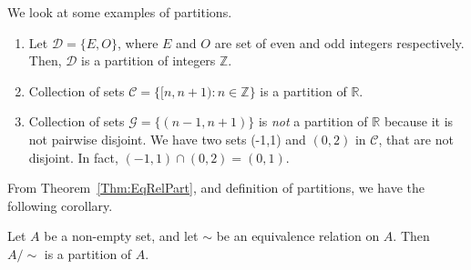 \documentclass[a4paper,english,12pt]{article}
\begin{document}
\begin{exmp} We look at some examples of partitions. 
	\begin{enumerate}
		\item Let $\mathcal{D} = \{E, O\}$, where $E$ and $O$ are set of even and odd integers respectively. Then, $\mathcal{D}$ is a partition of integers $\mathbb{Z}$.
		\item Collection of sets $\mathcal{C} = \{[n, n + 1) : n \in \mathbb{Z}\}$ is a partition of $\mathbb{R}$.
		\item Collection of sets $\mathcal{G} = \{(n-1, n + 1)\}$ is \textit{not} a partition of $\mathbb{R}$ because it is not pairwise disjoint. We have two sets (-1,1) and $(0,2)$ in $\mathcal{C}$, that are not disjoint. In fact, $(-1,1)\cap(0,2) = (0,1)$.
	\end{enumerate}
\end{exmp}
From Theorem~\ref{Thm:EqRelPart}, and definition of partitions, we have the following corollary.
\begin{cor}\label{Cor:QuoPart}
	Let $A$ be a non-empty set, and let $\sim$ be an equivalence relation on $A$. Then $A/\sim$ is a partition of $A$.
\end{cor}
\end{document}
